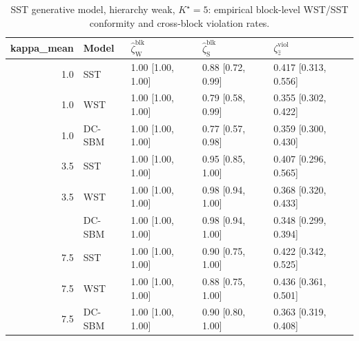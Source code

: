 \begin{table}
\centering
\caption{SST generative model, hierarchy weak, $K^\star=5$: empirical block-level WST/SST conformity and cross-block violation rates.}
\centering
\begin{tabular}[t]{rllll}
\toprule
kappa_mean & Model & $\widehat\zeta_{\mathrm{W}}^{\mathrm{blk}}$ & $\widehat\zeta_{\mathrm{S}}^{\mathrm{blk}}$ & $\zeta^{\mathrm{viol}}_{\hat z}$\\
\midrule
1.0 & SST & 1.00 [1.00, 1.00] & 0.88 [0.72, 0.99] & 0.417 [0.313, 0.556]\\
1.0 & WST & 1.00 [1.00, 1.00] & 0.79 [0.58, 0.99] & 0.355 [0.302, 0.422]\\
1.0 & DC-SBM & 1.00 [1.00, 1.00] & 0.77 [0.57, 0.98] & 0.359 [0.300, 0.430]\\
3.5 & SST & 1.00 [1.00, 1.00] & 0.95 [0.85, 1.00] & 0.407 [0.296, 0.565]\\
3.5 & WST & 1.00 [1.00, 1.00] & 0.98 [0.94, 1.00] & 0.368 [0.320, 0.433]\\
\addlinespace
3.5 & DC-SBM & 1.00 [1.00, 1.00] & 0.98 [0.94, 1.00] & 0.348 [0.299, 0.394]\\
7.5 & SST & 1.00 [1.00, 1.00] & 0.90 [0.75, 1.00] & 0.422 [0.342, 0.525]\\
7.5 & WST & 1.00 [1.00, 1.00] & 0.88 [0.75, 1.00] & 0.436 [0.361, 0.501]\\
7.5 & DC-SBM & 1.00 [1.00, 1.00] & 0.90 [0.80, 1.00] & 0.363 [0.319, 0.408]\\
\bottomrule
\end{tabular}
\end{table}

